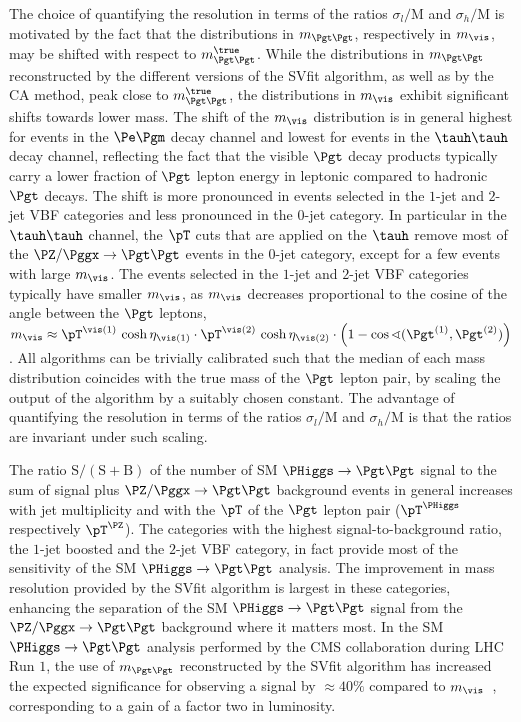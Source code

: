 The choice of quantifying the resolution in terms of the ratios $\sigma_{l}/\textrm{M}$ and $\sigma_{h}/\textrm{M}$ is motivated 
by the fact that the distributions in $m_{\Pgt\Pgt}$, respectively in $m_{\vis}$, may be shifted with respect to $m_{\Pgt\Pgt}^{\true}$.
While the distributions in $m_{\Pgt\Pgt}$ reconstructed by the different versions of the SVfit algorithm,
as well as by the CA method, peak close to $m_{\Pgt\Pgt}^{\true}$,
the distributions in $m_{\vis}$ exhibit significant shifts towards lower mass.
The shift of the $m_{\vis}$ distribution is in general highest for events in the $\Pe\Pgm$ decay channel and lowest for events in the $\tauh\tauh$ decay channel,
reflecting the fact that the visible $\Pgt$ decay products typically carry a lower fraction of $\Pgt$ lepton energy in leptonic compared to hadronic $\Pgt$ decays.
The shift is more pronounced in events selected in the $1$-jet and $2$-jet VBF categories and less pronounced in the $0$-jet category.
In particular in the $\tauh\tauh$ channel,
the $\pT$ cuts that are applied on the $\tauh$ remove most of the $\PZ/\Pggx \to \Pgt\Pgt$ events in the $0$-jet category,
except for a few events with large $m_{\vis}$.
The events selected in the $1$-jet and $2$-jet VBF categories typically have smaller $m_{\vis}$, as $m_{\vis}$ decreases proportional to the cosine of the angle between the $\Pgt$ leptons,
$m_{\vis} \approx \pT^{\vis(1)} \, \cosh\eta_{\vis(1)} \cdot \pT^{\vis(2)} \, \cosh\eta_{\vis(2)} \cdot \left( 1 - \cos\sphericalangle(\Pgt^{(1)},\Pgt^{(2)}) \right)$.
All algorithms can be trivially calibrated such that the median of each mass distribution coincides with the true mass of the $\Pgt$ lepton pair,
by scaling the output of the algorithm by a suitably chosen constant.
The advantage of quantifying the resolution in terms of the ratios $\sigma_{l}/\textrm{M}$ and $\sigma_{h}/\textrm{M}$ is that the ratios
are invariant under such scaling.

The ratio $\textrm{S}/(\textrm{S} + \textrm{B})$
of the number of SM $\PHiggs \to \Pgt\Pgt$ signal to the sum of signal plus $\PZ/\Pggx \to \Pgt\Pgt$ background events in general increases with jet multiplicity
and with the $\pT$ of the $\Pgt$ lepton pair ($\pT^{\PHiggs}$ respectively $\pT^{\PZ}$).
The categories with the highest signal-to-background ratio, the $1$-jet boosted and the $2$-jet VBF category,
in fact provide most of the sensitivity of the SM $\PHiggs \to \Pgt\Pgt$ analysis.
The improvement in mass resolution provided by the SVfit algorithm is largest in these categories,
enhancing the separation of the SM $\PHiggs \to \Pgt\Pgt$ signal from the $\PZ/\Pggx \to \Pgt\Pgt$ background where it matters most.
In the SM $\PHiggs \to \Pgt\Pgt$ analysis performed by the CMS collaboration during LHC Run $1$,
the use of $m_{\Pgt\Pgt}$ reconstructed by the SVfit algorithm has increased the expected significance for observing a signal by $\approx 40\%$ compared to $m_{\vis}$~\cite{HIG-13-004},
corresponding to a gain of a factor two in luminosity.

